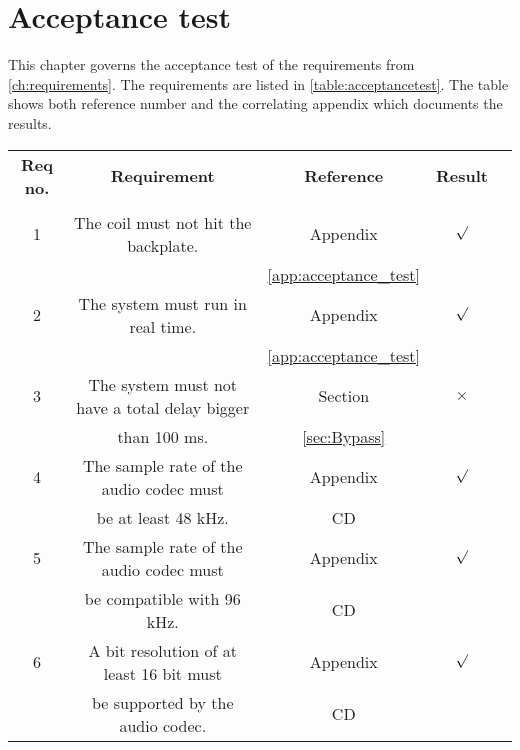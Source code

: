 \chapter{Acceptance test}

This chapter governs the acceptance test of the requirements from \autoref{ch:requirements}. The requirements are listed in \autoref{table:acceptancetest}. The table shows both reference number and the correlating appendix which documents the results.  

\renewcommand{\arraystretch}{0.95}
\begin{table}[H]
\centering
\begin{tabular}{|c|c|c|c|c|} \hline
\rowcolor{lightgray} \bfseries Req no. 	& \bfseries Requirement 						&  \bfseries Reference				&\bfseries Result 	\\ 
\rowcolor{lightgray}					&												&  									&		 			\\ \hline

1			& The coil must not hit the backplate. 			& Appendix 								&	$\surd$ 		\\ 
 			&												& \ref{app:acceptance_test}				&	 				\\ \hline
%
2			& The system must run in real time.	 			& Appendix								& 	$\surd$			\\ 
			& 												& \ref{app:acceptance_test}				&					\\ \hline
%
3			& The system must not have a total delay bigger & Section								&  $\times$			\\ 
			& than 100 ms.			 						& \ref{sec:Bypass}						&					\\ \hline
%
4			& The sample rate of the audio codec must   	& Appendix								& 	$\surd$			\\ 
			& be at least 48 kHz.							&	CD									&					\\ \hline

5			& The sample rate of the audio codec must   	& Appendix								& 	$\surd$			\\ 
			& be compatible with 96 kHz.					&	CD									&					\\ \hline
6			&  A bit resolution of at least 16 bit must 	& Appendix								&	$\surd$			\\ 
			&  be supported by the audio codec. 	 	 	&	CD					 				&					\\ \hline


\end{tabular}
\end{table}
